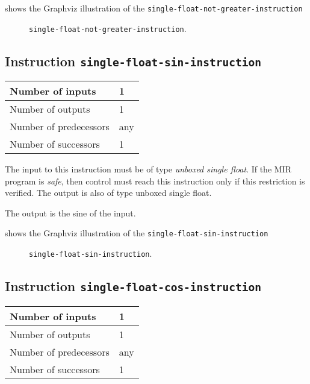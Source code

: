  shows the Graphviz illustration of the
\texttt{single-float-not-greater-instruction}

\begin{figure}
\begin{center}
\end{center}
\caption{\label{fig-single-float-not-greater-instruction}
\texttt{single-float-not-greater-instruction}.}
\end{figure}

\subsection{Instruction \texttt{single-float-sin-instruction}}
\label{mir-instruction-single-float-div}

\begin{tabular}{|l|l|}
\hline
Number of inputs & 1\\
\hline
Number of outputs & 1\\
\hline
Number of predecessors & any\\
\hline
Number of successors & 1\\
\hline
\end{tabular}

The input to this instruction must be of type \emph{unboxed single
  float}.  If the MIR program is \emph{safe}, then control must reach
this instruction only if this restriction is verified.  The output is
also of type unboxed single float.

The output is the sine of the input.

 shows the Graphviz illustration of the
\texttt{single-float-sin-instruction}

\begin{figure}
\begin{center}
\end{center}
\caption{\label{fig-single-float-sin-instruction}
\texttt{single-float-sin-instruction}.}
\end{figure}

\subsection{Instruction \texttt{single-float-cos-instruction}}
\label{mir-instruction-single-float-div}

\begin{tabular}{|l|l|}
\hline
Number of inputs & 1\\
\hline
Number of outputs & 1\\
\hline
Number of predecessors & any\\
\hline
Number of successors & 1\\
\hline
\end{tabular}

